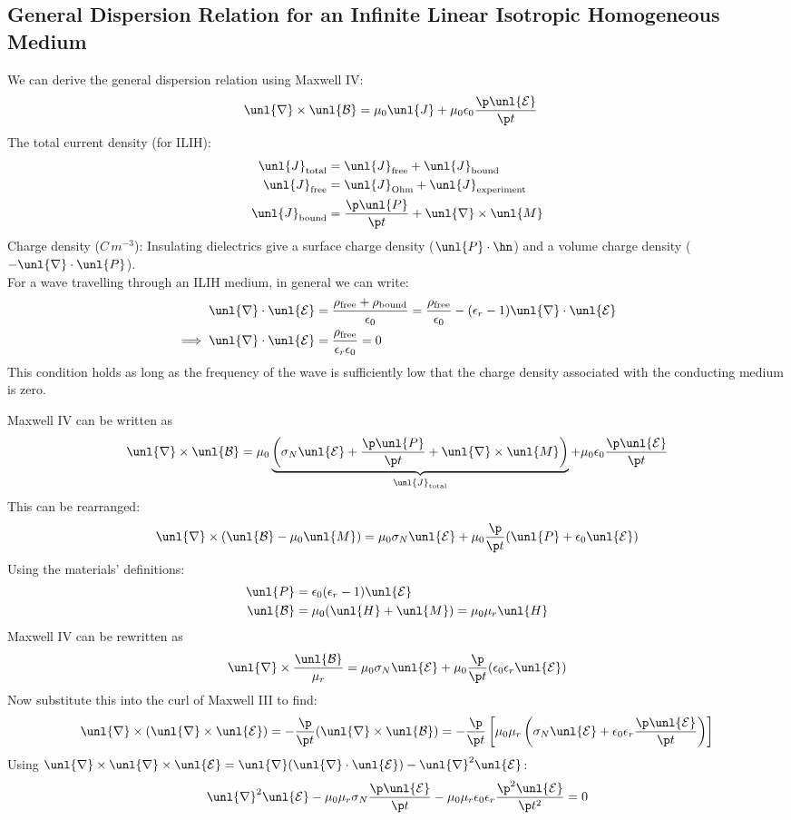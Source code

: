 \documentclass[a4paper, 11pt, normalem]{report}
\renewcommand\E{\mathcal{E}}
\newcommand\uE{\unl{\E}}
\renewcommand\B{\mathcal{B}}
\newcommand\uB{\unl{\B}}
\renewcommand\del{\unl{\nabla}}
\newcommand\eno{\epsilon_0}
\newcommand\J{\unl{J}}
\newcommand\M{\unl{M}}
\newcommand\er{\epsilon_r}
\begin{document}
\subsection{General Dispersion Relation for an Infinite Linear Isotropic Homogeneous Medium}
We can derive the general dispersion relation using Maxwell \RN{4}:
\begin{align}
    \del\times\uB &= \mu_0\J + \mu_0\eno\frac{\p\uE}{\p t}
\end{align}
The total current density (for ILIH):
\begin{align}
    \J_{\text{total}} &= \J_{\text{free}} + \J_{\text{bound}} \\
    \J_{\text{free}} &= \J_{\text{Ohm}} + \J_{\text{experiment}} \\
    \J_{\text{bound}} &= \frac{\p \unl{P}}{\p t} + \del\times\M
\end{align}
Charge density ($C\,m^{-3}$): Insulating dielectrics give a surface charge density ($\unl{P}\cdot\hn$) and a volume charge density ($-\del\cdot\unl{P}$).\\
For a wave travelling through an ILIH medium, in general we can write:
\begin{align}
    \del\cdot\uE &= \frac{\rho_{\text{free}}+\rho_{\text{bound}}}{\eno} = \frac{\rho_{\text{free}}}{\eno} - (\er - 1)\del\cdot\uE \\
    \implies \del\cdot\uE &= \frac{\rho_{\text{free}}}{\er\eno} = 0
\end{align}
This condition holds as long as the frequency of the wave is sufficiently low that the charge density associated with the conducting medium is zero.

Maxwell \RN{4} can be written as
\begin{equation}
    \del\times\uB = \mu_0\underbrace{\left(\sigma_N \uE + \frac{\p \unl{P}}{\p t} + \del\times\M\right)}_{\J_{\text{total}}} + \mu_0\eno\frac{\p \uE}{\p t}
\end{equation}
This can be rearranged:
\begin{align}
    \del\times(\uB - \mu_0\M) = \mu_0\sigma_N\uE + \mu_0\frac{\p}{\p t}(\unl{P} + \eno\uE)
\end{align}
Using the materials' definitions:
\begin{align}
    \unl{P} &= \eno(\er - 1)\uE \\
    \uB &= \mu_0(\unl{H}+\M) = \mu_0\mu_r\unl{H}
\end{align}
Maxwell \RN{4} can be rewritten as
\begin{equation}
    \del\times\frac{\uB}{\mu_r} = \mu_0\sigma_N\uE + \mu_0\frac{\p}{\p t} (\eno\er\uE)
\end{equation}
Now substitute this into the curl of Maxwell \RN{3} to find:
\begin{align}
    \del\times(\del\times\uE) = -\frac{\p}{\p t}(\del\times\uB) = -\frac{\p}{\p t}\left[\mu_0\mu_r\left(\sigma_N\uE + \eno\er\frac{\p \uE}{\p t}\right)\right]
\end{align}
Using $\del\times\del\times\uE = \del(\del\cdot\uE) - \del^2\uE$:
\begin{align}
    \del^2\uE - \mu_0\mu_r\sigma_N\frac{\p \uE}{\p t} - \mu_0\mu_r\eno\er\frac{\p^2\uE}{\p t^2} = 0
\end{align}
\end{document}
